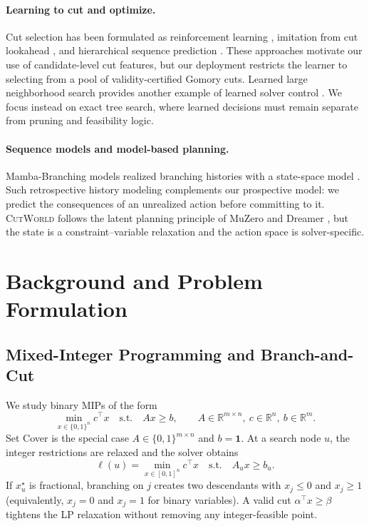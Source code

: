 \documentclass{article}
\newcommand{\CutWorld}{\textsc{CutWorld}}
\newcommand{\R}{\mathbb{R}}
\begin{document}
\paragraph{Learning to cut and optimize.}
Cut selection has been formulated as reinforcement learning
\citep{tang2020reinforcement}, imitation from cut lookahead
\citep{paulus2022learning}, and hierarchical sequence prediction \citep{wang2023hierarchical}. These approaches motivate our use of candidate-level cut features, but our deployment restricts the learner to selecting from a pool of validity-certified Gomory cuts. Learned large neighborhood search provides another example of learned solver control \citep{sonnerat2021learning}. We focus instead on exact tree search, where learned decisions must remain separate from pruning and feasibility logic.

\paragraph{Sequence models and model-based planning.}
Mamba-Branching models realized branching histories with a state-space model \citep{zhang2026mambabranchin}. Such retrospective history modeling complements our prospective model: we predict the consequences of an unrealized action before committing to it. \CutWorld{} follows the latent planning principle of MuZero and Dreamer
\citep{schrittwieser2020mastering,hafner2020dream}, but the state is a constraint--variable relaxation and the action space is solver-specific.


\section{Background and Problem Formulation}
\label{sec:background}

\subsection{Mixed-Integer Programming and Branch-and-Cut}

We study binary MIPs of the form
\begin{equation}
  \min_{x\in\{0,1\}^{n}} c^\top x
  \quad\text{s.t.}\quad
  Ax\ge b,
  \qquad
  A\in\R^{m\times n},\ c\in\R^n,\ b\in\R^m .
  \label{eq:mip}
\end{equation}
Set Cover is the special case $A\in\{0,1\}^{m\times n}$ and
$b=\mathbf{1}$. At a search node $u$, the integer restrictions are relaxed
and the solver obtains
\begin{equation}
  \ell(u)=\min_{x\in[0,1]^n} c^\top x
  \quad\text{s.t.}\quad A_u x\ge b_u .
  \label{eq:lp}
\end{equation}
If $x_u^\star$ is fractional, branching on $j$ creates two descendants with $x_j\le 0$ and $x_j\ge 1$ (equivalently, $x_j=0$ and $x_j=1$ for binary variables). A valid cut $\alpha^\top x\ge\beta$ tightens the LP relaxation without removing any integer-feasible point.
\end{document}

